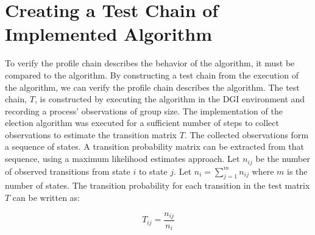 
\section{Creating a Test Chain of Implemented Algorithm}

To verify the profile chain describes the behavior of the algorithm, it must be compared to the algorithm.
By constructing a test chain from the execution of the algorithm, we can verify the profile chain describes the algorithm.
The test chain, $T$, is constructed by executing the algorithm in the DGI environment and recording a process' observations of group size.
The implementation of the election algorithm was executed for a sufficient number of steps to collect observations to estimate the transition matrix $T$.
The collected observations form a sequence of states.
A transition probability matrix can be extracted from that sequence, using a maximum likelihood estimates approach.
Let $n_{ij}$ be the number of observed transitions from state $i$ to state $j$. Let $n_{i}=\sum_{j=1}^{m} n_{ij}$ where $m$ is the number of states.
The transition probability for each transition in the test matrix $T$ can be written as:

\[ T_{ij} = \frac{n_{ij}}{n_{i}} \]
